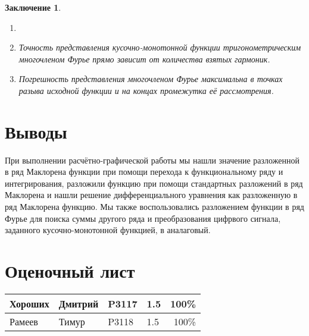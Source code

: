 \documentclass[12pt, a4paper]{article}
\newtheorem*{finish}{Заключение}
\begin{document}
\begin{finish}
\begin{enumerate}
\item[]

\item Точность представления кусочно-монотонной функции тригонометрическим многочленом Фурье прямо зависит от количества взятых гармоник.

\item Погрешность представления многочленом Фурье максимальна в точках разыва исходной функции и на концах промежутка её рассмотрения.
\end{enumerate}

\end{finish}
\section{Выводы}
При выполнении расчётно-графической работы мы нашли значение разложенной в ряд Маклорена функции при помощи перехода к функциональному ряду и интегрирования, разложили функцию при помощи стандартных разложений в ряд Маклорена и нашли решение дифференциального уравнения  как разложенную в ряд Маклорена функцию. Мы также воспользовались разложением функции в ряд Фурье для поиска суммы другого ряда и преобразования цифрвого сигнала, заданного кусочно-монотонной функцией, в аналаговый.
\newpage
\section{Оценочный лист}
\begin{center}
\large
\begin{tabular}{|l|l|l|l|r|}
\hline
Хороших & Дмитрий & P3117 & 1.5 & 100\%\\
\hline
Рамеев & Тимур & P3118 & 1.5  & 100\%\\
\hline
\end{tabular}
\end{center}
\end{document}
